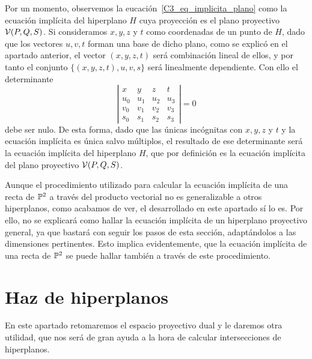 Por un momento, observemos la eucación~\eqref{C3_eq_implicita_plano} como la ecuación implícita del hiperplano $H$ cuya proyección es el plano proyectivo $\mathcal{V}(P,Q,S)$. Si consideramos $x,y,z$ y $t$ como coordenadas de un punto de $H$, dado que los vectores $u,v,t$ forman una base de dicho plano, como se explicó en el apartado anterior, el vector $(x,y,z,t)$ será combinación lineal de ellos, y por tanto el conjunto $\{(x,y,z,t),u,v,s\}$ será linealmente dependiente. Con ello el determinante
\begin{equation}
	\left| \begin{array}{cccc}
	x & y & z& t\\
	u_0 & u_1 & u_2 & u_3\\
	v_0 & v_1 & v_2 & v_3\\
	s_0 & s_1 & s_2 & s_3
	\end{array}\right| =0
\end{equation}
debe ser nulo. De esta forma, dado que las únicas incógnitas con $x,y,z$ y $t$ y la ecuación implícita es única salvo múltiplos, el resultado de ese determinante será la ecuación implícita del hiperplano $H$, que por definición es la ecuación implícita del plano proyectivo $\mathcal{V}(P,Q,S)$.

\begin{obs}
	Aunque el procedimiento utilizado para calcular la ecuación implícita de una recta de $\mathbb{P}^2$ a través del producto vectorial no es generalizable a otros hiperplanos, como acabamos de ver, el desarrollado en este apartado sí lo es. Por ello, no se explicará como hallar la ecuación implícita de un hiperplano proyectivo general, ya que bastará con seguir los pasos de esta sección, adaptándolos a las dimensiones pertinentes. Esto implica evidentemente, que la ecuación implícita de una recta de $\mathbb{P}^2$ se puede hallar también a través de este procedimiento.
\end{obs}

\section{Haz de hiperplanos}
En este apartado retomaremos el espacio proyectivo dual y le daremos otra utilidad, que nos será de gran ayuda a la hora de calcular intersecciones de hiperplanos.

